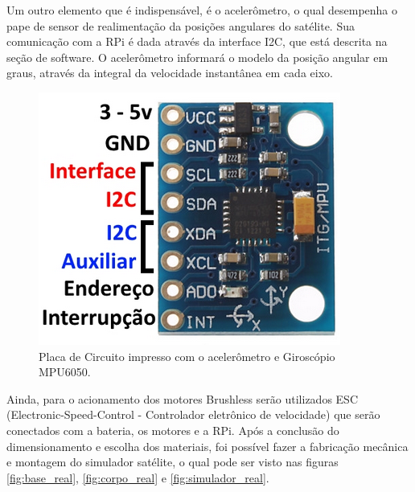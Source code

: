 Um outro elemento que é indispensável, é o acelerômetro, o qual desempenha o pape de sensor de realimentação da posições angulares do satélite. Sua comunicação com a RPi é dada através da interface I2C, que está descrita na seção de software. O acelerômetro informará o modelo da posição angular em graus, através da integral da velocidade instantânea em cada eixo.

\begin{figure}[H]
  \caption{Placa de Circuito impresso com o acelerômetro e Giroscópio MPU6050.}
  \begin{center}
      \includegraphics[scale=.4]{metodologia/img/pci_acelerometro_calache_p22}
  \end{center}
  \label{fig:pci_acelerometro_calache_p22}
\end{figure}

Ainda, para o acionamento dos motores Brushless serão utilizados ESC (Electronic-Speed-Control - Controlador eletrônico de velocidade) que serão conectados com a bateria, os motores e a RPi. Após a conclusão do dimensionamento e escolha dos materiais, foi possível fazer a fabricação mecânica e montagem do simulador satélite, o qual pode ser visto nas figuras \ref{fig:base_real}, \ref{fig:corpo_real} e \ref{fig:simulador_real}.

